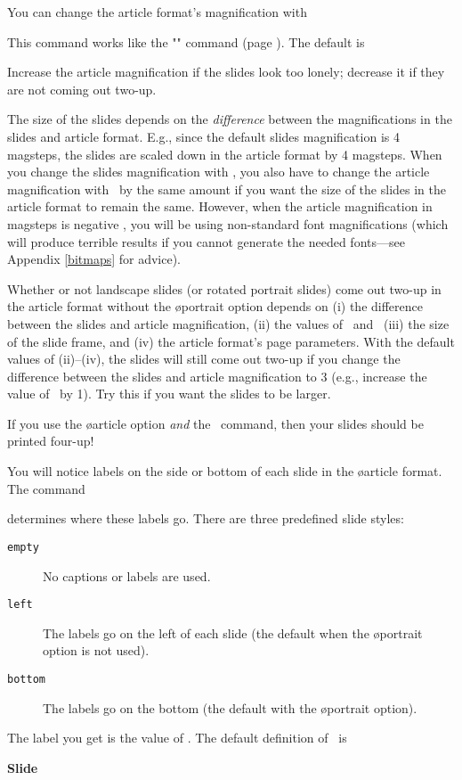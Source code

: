 You can change the article format's magnification with
\begin{MD}
\end{MD}
This command works like the "\slidesmag" command (page \pageref{+slidesmag}).
The default is
\begin{LVerbatim}
\end{LVerbatim}
Increase the article magnification if the slides look too lonely; decrease it
if they are not coming out two-up.

The size of the slides depends on the {\em difference} between the
magnifications in the slides and article format. E.g., since the default
slides magnification is 4 magsteps, the slides are scaled down in the article
format by 4 magsteps. When you change the slides magnification with
\n\slidesmag, you also have to change the article magnification with
\n\articlemag\ by the same amount if you want the size of the slides in the
article format to remain the same. However, when the article magnification in
magsteps is negative , you will be using non-standard font magnifications
(which will produce terrible results if you cannot generate the needed
fonts---see Appendix \ref{bitmaps} for advice).

Whether or not landscape slides (or rotated portrait slides) come out two-up
in the article format without the \o{portrait} option depends on (i) the
difference between the slides and article magnification, (ii) the values of
\n\slidewidth\ and \n\slideheight\, (iii) the size of the slide frame, and
(iv) the article format's page parameters. With the default values of
(ii)--(iv), the slides will still come out two-up if you change the difference
between the slides and article magnification to 3 (e.g., increase the value of
\n\articlemag\ by 1). Try this if you want the slides to be larger.

If you use the \o{article} option {\em and} the \n\twoup\ command, then your
slides should be printed four-up!

You will notice labels on the side or bottom of each slide in the \o{article}
format. The command
\begin{MD}
\end{MD}
determines where these labels go. There are three predefined slide styles:
\begin{description}
\item[\tt empty] No captions or labels are used.
\item[\tt left]  The labels go on the left of each slide (the default when the
\o{portrait} option is not used).
\item[\tt bottom] The labels go on the bottom (the default with the
\o{portrait} option).
\end{description}
The label you get is the value of \N\slidelabel. The default definition of
\n\slidelabel\ is
\begin{LVerbatim}
  \bf Slide \theslide
\end{LVerbatim}

